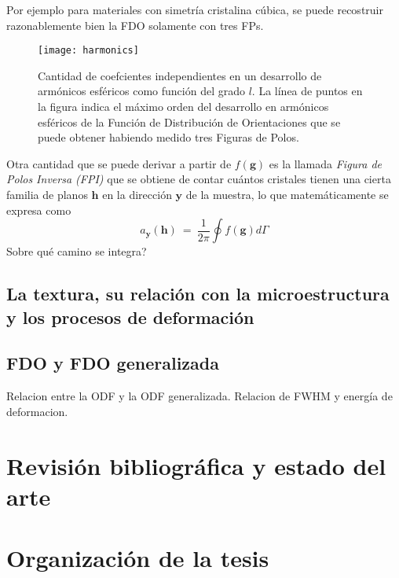 Por ejemplo para materiales con simetría cristalina cúbica, se puede recostruir razonablemente bien la FDO solamente con tres FPs.
\begin{figure}[!htb]
  \centering
  \texttt{[image: harmonics]}
  \caption{Cantidad de coefcientes independientes en un desarrollo de armónicos esféricos como función del grado $l$. La línea de puntos en la figura indica el máximo orden del desarrollo en armónicos esféricos de la Función de Distribución de Orientaciones que se puede obtener habiendo medido tres Figuras de Polos.}
  \label{fig:harmonics}
\end{figure}

Otra cantidad que se puede derivar a partir de $f(\mathbf{g})$ es la llamada \textit{Figura de Polos Inversa (FPI)} que se obtiene de contar cuántos cristales tienen una cierta familia de planos $\mathbf{h}$ en la dirección $\mathbf{y}$ de la muestra, lo que matemáticamente se expresa como
\begin{equation}
  a_{\mathbf{y}}(\mathbf{h}) \ = \ \frac{1}{2 \pi} \oint f(\mathbf{g}) d\Gamma
  \label{eq:IPF}
\end{equation}
\noindent
Sobre qué camino se integra?

\subsection{La textura, su relación con la microestructura y los procesos de deformación}\label{SS:Defo}

\subsection{FDO y FDO generalizada}\label{SS:ODFG}
Relacion entre la ODF y la ODF generalizada. Relacion de FWHM y energía de deformacion.

\section{Revisión bibliográfica y estado del arte}\label{S:RB}

\section{Organización de la tesis}\label{S:Org}
